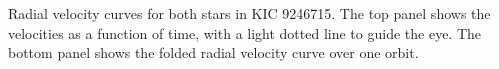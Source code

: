 \label{fig:rvfig} Radial velocity curves for both stars in KIC 9246715. The top panel shows the velocities as a function of time, with a light dotted line to guide the eye. The bottom panel shows the folded radial velocity curve over one orbit.